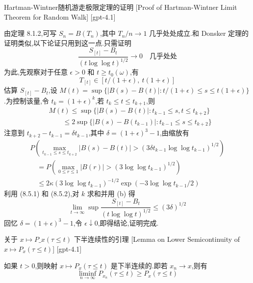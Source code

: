 \documentclass[UTF8]{ctexart}
\begin{document}
    
    
    \begin{prf}
        {Hartman-Wintner随机游走极限定理的证明}
        [Proof of Hartman-Wintner Limit Theorem for Random Walk]
        [gpt-4.1]
        
由定理 8.1.2,可写 $S_n = B(T_n)$,其中 $T_n / n \to 1$ 几乎处处成立.和 Donsker 定理的证明类似,以下论证只用到这一点.只需证明
\[
\frac{S_{[t]} - B_t}{(t \log \log t)^{1/2}} \to 0 \quad \text{几乎处处}
\]
为此,先观察对于任意 $\epsilon > 0$ 和 $t \geq t_0(\omega)$,有
\[
T_{[t]} \in [ t / (1 + \epsilon),\ t (1 + \epsilon) ]
\]
估算 $S_{[t]} - B_t$,设 $M(t) = \sup \{ |B(s) - B(t)| : t / (1 + \epsilon) \le s \le t (1 + \epsilon) \}$.为控制该量,令 $t_k = (1 + \epsilon)^k$,若 $t_k \leq t \leq t_{k+1}$,则
\[
\begin{array}{rl}
& M(t) \le \sup \{ |B(s) - B(t)| : t_{k-1} \le s, t \le t_{k+2} \} \\
& \qquad \le 2 \sup \{ |B(s) - B(t_{k-1})| : t_{k-1} \le s \le t_{k+2} \}
\end{array}
\]
注意到 $t_{k+2} - t_{k-1} = \delta t_{k-1}$,其中 $\delta = (1 + \epsilon)^3 - 1$,由缩放有
\[
\begin{array}{l}
P\left( \max_{t_{k-1} \leq s \leq t_{k+2}} |B(s) - B(t)| > (3 \delta t_{k-1} \log \log t_{k-1})^{1/2} \right) \\
\quad = P\left( \max_{0 \leq r \leq 1} |B(r)| > (3 \log \log t_{k-1})^{1/2} \right) \\
\quad \leq 2 \kappa (3 \log \log t_{k-1})^{-1/2} \exp( - 3 \log \log t_{k-1} / 2 )
\end{array}
\]
利用 (8.5.1) 和 (8.5.2),对 $k$ 求和并用 (b) 得
\[
\lim_{t \to \infty} \sup \frac{S_{[t]} - B_t}{(t \log \log t)^{1/2}} \leq (3 \delta)^{1/2}
\]
回忆 $\delta = (1 + \epsilon)^3 - 1$,令 $\epsilon \downarrow 0$,即得结论,证明完成.

    \end{prf}
    
    
    
    \begin{lma}
        {关于 $x \mapsto P\_x(\tau \leq t)$ 下半连续性的引理}
        [Lemma on Lower Semicontinuity of $x \mapsto P_x(\tau \leq t)$]
        [gpt-4.1]
        
如果 $t > 0$,则映射 $x \mapsto P_x(\tau \leq t)$ 是下半连续的.即若 $x_n \to x$,则有
\[
\liminf_{n \to \infty} P_{x_n}(\tau \leq t) \geq P_x(\tau \leq t)
\]

    \end{lma}
    
\end{document}
